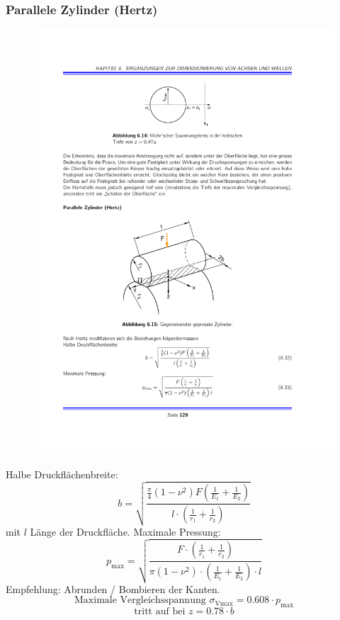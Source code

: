 		\subsubsection{Parallele Zylinder (Hertz)} %
			\begin{figure}
				\vspace{-1cm}
				\includegraphics[scale=.525]{graphics/parallele_zylinder}
			\end{figure}
			
			Halbe Druckflächenbreite:
			\begin{equation*}
				b = \sqrt{\frac{\frac{\pi}{4}(1-\nu^2)F\left( \frac{1}{E_1}+\frac{1}{E_2}\right)}{l \cdot \left( \frac{1}{r_1}+ \frac{1}{r_2}\right)}}
			\end{equation*}
			mit $l$ Länge der Druckfläche. Maximale Pressung:
			\begin{equation*}
				p_{\text{max}}=\sqrt{
			\frac{F \cdot \left( \frac{1}{r_1}+ \frac{1}{r_2}\right)}
				{\pi (1-\nu^2) \cdot \left( \frac{1}{E_1}+\frac{1}{E_2}\right) \cdot l }}
			\end{equation*}
			Empfehlung: Abrunden / Bombieren der Kanten.
			\begin{equation*}
				\text{Maximale Vergleichsspannung } \sigma_\text{Vmax} = 0.608 \cdot p_\text{max}
			\end{equation*}
			\begin{equation*}
				\text{tritt auf bei } z = 0.78 \cdot b
			\end{equation*}
